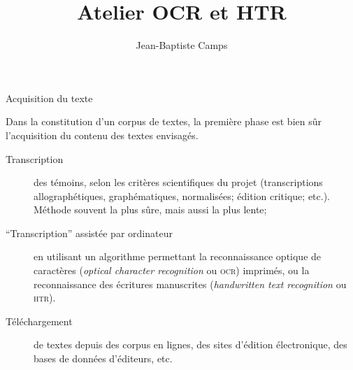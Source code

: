 \documentclass[10pt, compress,urlcolor=blue]{beamer}
\title{Atelier OCR et HTR}
\author{Jean-Baptiste Camps}
\institute{Masters HNC et TNAH | ENC (PSL)}
\begin{document}
\maketitle

\begin{frame}{Acquisition du texte}
    
    Dans la constitution d'un corpus de textes, la première phase est bien sûr l'acquisition du contenu des textes envisagés.
\begin{description}
	\item[Transcription] des témoins, selon les critères scientifiques du projet (transcriptions allographétiques, graphématiques, normalisées; édition critique; etc.). Méthode souvent la plus sûre, mais aussi la plus lente;
	\item[``Transcription'' assistée par ordinateur] en utilisant un algorithme permettant la reconnaissance optique de caractères (\textit{optical character recognition} ou \textsc{ocr}) imprimés, ou la reconnaissance des écritures manuscrites (\textit{handwritten text recognition} ou \textsc{htr}).
	\item[Téléchargement] de textes depuis des corpus en lignes, des sites d'édition électronique, des bases de données d'éditeurs, etc.
\end{description}
    
\end{frame}
\end{document}
